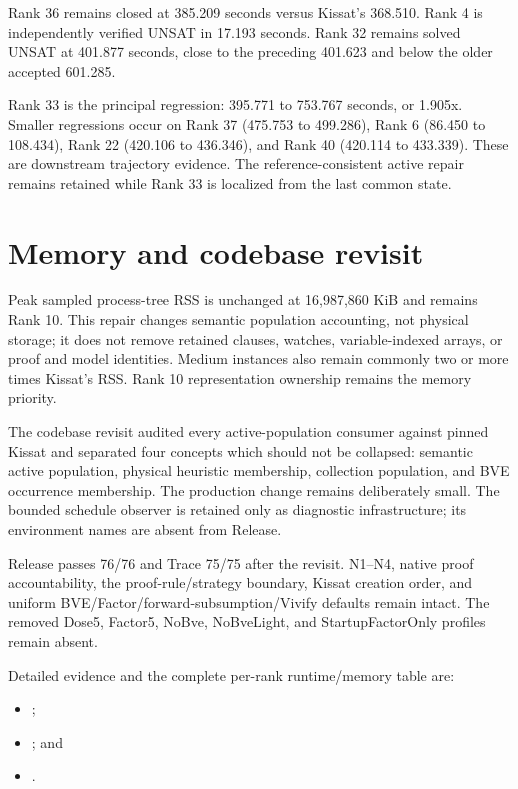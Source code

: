 \documentclass[11pt]{article}
\begin{document}
Rank 36 remains closed at 385.209 seconds versus Kissat's 368.510.  Rank 4 is
independently verified UNSAT in 17.193 seconds.  Rank 32 remains solved UNSAT
at 401.877 seconds, close to the preceding 401.623 and below the older accepted
601.285.

Rank 33 is the principal regression: 395.771 to 753.767 seconds, or 1.905x.
Smaller regressions occur on Rank 37 (475.753 to 499.286), Rank 6 (86.450 to
108.434), Rank 22 (420.106 to 436.346), and Rank 40 (420.114 to 433.339).
These are downstream trajectory evidence.  The reference-consistent active
repair remains retained while Rank 33 is localized from the last common state.

\section{Memory and codebase revisit}

Peak sampled process-tree RSS is unchanged at 16,987,860 KiB and remains Rank
10.  This repair changes semantic population accounting, not physical storage;
it does not remove retained clauses, watches, variable-indexed arrays, or proof
and model identities.  Medium instances also remain commonly two or more times
Kissat's RSS.  Rank 10 representation ownership remains the memory priority.

The codebase revisit audited every active-population consumer against pinned
Kissat and separated four concepts which should not be collapsed: semantic
active population, physical heuristic membership, collection population, and
BVE occurrence membership.  The production change remains deliberately small.
The bounded schedule observer is retained only as diagnostic infrastructure;
its environment names are absent from Release.

Release passes 76/76 and Trace 75/75 after the revisit.  N1--N4, native proof
accountability, the proof-rule/strategy boundary, Kissat creation order, and
uniform BVE/Factor/forward-subsumption/Vivify defaults remain intact.  The
removed Dose5, Factor5, NoBve, NoBveLight, and StartupFactorOnly profiles remain
absent.

Detailed evidence and the complete per-rank runtime/memory table are:

\begin{itemize}
\item {};
\item {}; and
\item {}.
\end{itemize}
\end{document}
